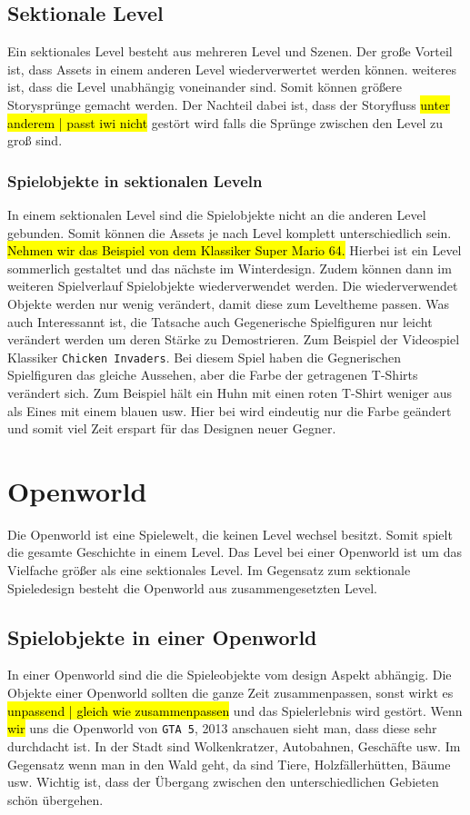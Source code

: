 \subsection {Sektionale Level}
Ein sektionales Level besteht aus mehreren Level und Szenen. Der große Vorteil ist, dass Assets in einem anderen Level wiederverwertet werden können. weiteres ist, dass die Level unabhängig voneinander sind. Somit können größere Storysprünge gemacht werden. Der Nachteil dabei ist, dass der Storyfluss \hl{unter anderem | passt iwi nicht} gestört wird falls die Sprünge zwischen den Level zu groß sind. 

\subsubsection{Spielobjekte in sektionalen Leveln}
In einem sektionalen Level sind die Spielobjekte nicht an die anderen Level gebunden. Somit können die Assets je nach Level komplett unterschiedlich sein. \hl{Nehmen wir das Beispiel von dem Klassiker Super Mario 64.} Hierbei ist ein Level sommerlich gestaltet und das nächste im Winterdesign. Zudem können dann im weiteren Spielverlauf Spielobjekte wiederverwendet werden. Die wiederverwendet Objekte werden nur wenig verändert, damit diese zum Leveltheme passen. Was auch Interessannt ist, die Tatsache auch Gegenerische Spielfiguren nur leicht verändert werden um deren Stärke zu Demostrieren. Zum Beispiel der Videospiel Klassiker \verb+Chicken Invaders+. Bei diesem Spiel haben die Gegnerischen Spielfiguren das gleiche Aussehen, aber die Farbe der getragenen T-Shirts verändert sich. Zum Beispiel hält ein Huhn mit einen roten T-Shirt weniger aus als Eines mit einem blauen usw. Hier bei wird eindeutig nur die Farbe geändert und somit viel Zeit erspart für das Designen neuer Gegner.

\section{Openworld}
Die Openworld ist eine Spielewelt, die keinen Level wechsel besitzt. Somit spielt die gesamte Geschichte in einem Level. Das Level bei einer Openworld ist um das Vielfache größer als eine sektionales Level. Im Gegensatz zum sektionale Spieledesign besteht die Openworld aus zusammengesetzten Level.


\subsection{Spielobjekte in einer Openworld}
In einer Openworld sind die die Spieleobjekte vom design Aspekt abhängig. Die Objekte einer Openworld sollten die ganze Zeit zusammenpassen, sonst wirkt es \hl{unpassend | gleich wie zusammenpassen} und das Spielerlebnis wird gestört. Wenn \hl{wir} uns die Openworld von \verb+GTA 5+, 2013 anschauen sieht man, dass diese sehr durchdacht ist. In der Stadt sind Wolkenkratzer, Autobahnen, Geschäfte usw. Im Gegensatz wenn man in den Wald geht, da sind Tiere, Holzfällerhütten, Bäume usw. Wichtig ist, dass der Übergang zwischen den unterschiedlichen Gebieten schön übergehen. 

